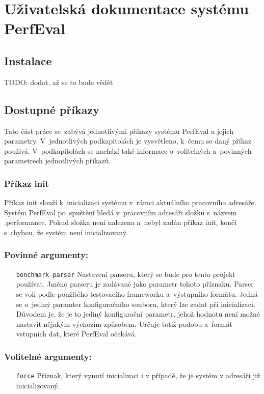 \chapter{Uživatelská dokumentace systému PerfEval}

\section{Instalace}

TODO: dodat, až se to bude vědět

\section{Dostupné příkazy}

Tato část práce se~zabývá jednotlivými příkazy systému PerfEval a jejich parametry.
V~jednotlivých podkapitolách je vysvětleno, k~čemu se daný příkaz používá. V~podkapitolách
se nachází také informace o~volitelných a~povinných parametrech jednotlivých příkazů.

\subsection{Příkaz init}

Příkaz init slouží k~inicializaci systému v~rámci aktuálního pracovního adresáře.
Systém PerfEval po~spuštění hledá v~pracovním adresáři složku s~názvem .performance. Pokud složka
není nalezena a~nebyl zadán příkaz init, končí s~chybou, že systém není inicializovaný.

\subsection*{Povinné argumenty:}
\begin{itemize}[label=\texttt{\textbf{\textendash}}]
    \item[\texttt{benchmark-parser}] Nastavení parseru, který se bude pro tento projekt používat.
        Jméno parseru je zadávané jako parametr tohoto příznaku.
        Parser se volí podle použitého testovacího frameworku a~výstupního formátu.
        Jedná se o~jediný paramter konfiguračního souboru, který lze zadat při inicializaci.
        Důvodem je, že je to jediný konfigurační parametr, jehož hodnotu není možné nastavit nějakým výchozím způsobem.
        Určuje totiž podobu a~formát vstupních dat, které PerfEval očekává.
\end{itemize}

\subsection*{Volitelné argumenty:}
\begin{itemize}[label=\texttt{\textbf{\textendash}}]
    \item[\texttt{force}] Příznak, který vynutí inicializaci i v případě, že je systém v adresáři již inicializovaný.
\end{itemize}

